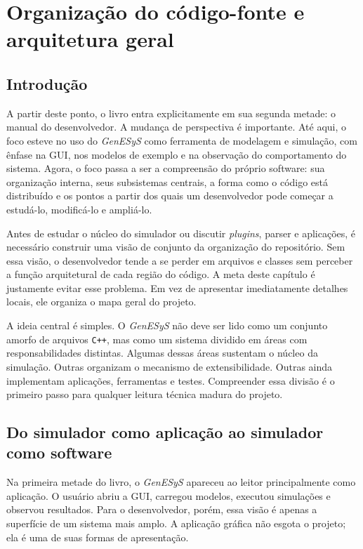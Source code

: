 \chapter{Organização do código-fonte e arquitetura geral}
\label{chap:organizacao_codigo_fonte_arquitetura_geral}

\section{Introdução}
\label{sec:cap6_introducao}

A partir deste ponto, o livro entra explicitamente em sua segunda metade: o manual do desenvolvedor. A mudança de perspectiva é importante. Até aqui, o foco esteve no uso do \textit{GenESyS} como ferramenta de modelagem e simulação, com ênfase na GUI, nos modelos de exemplo e na observação do comportamento do sistema. Agora, o foco passa a ser a compreensão do próprio software: sua organização interna, seus subsistemas centrais, a forma como o código está distribuído e os pontos a partir dos quais um desenvolvedor pode começar a estudá-lo, modificá-lo e ampliá-lo.

Antes de estudar o núcleo do simulador ou discutir \textit{plugins}, parser e aplicações, é necessário construir uma visão de conjunto da organização do repositório. Sem essa visão, o desenvolvedor tende a se perder em arquivos e classes sem perceber a função arquitetural de cada região do código. A meta deste capítulo é justamente evitar esse problema. Em vez de apresentar imediatamente detalhes locais, ele organiza o mapa geral do projeto.

A ideia central é simples. O \textit{GenESyS} não deve ser lido como um conjunto amorfo de arquivos \texttt{C++}, mas como um sistema dividido em áreas com responsabilidades distintas. Algumas dessas áreas sustentam o núcleo da simulação. Outras organizam o mecanismo de extensibilidade. Outras ainda implementam aplicações, ferramentas e testes. Compreender essa divisão é o primeiro passo para qualquer leitura técnica madura do projeto.

\section{Do simulador como aplicação ao simulador como software}
\label{sec:cap6_do_simulador_como_aplicacao_ao_software}

Na primeira metade do livro, o \textit{GenESyS} apareceu ao leitor principalmente como aplicação. O usuário abriu a GUI, carregou modelos, executou simulações e observou resultados. Para o desenvolvedor, porém, essa visão é apenas a superfície de um sistema mais amplo. A aplicação gráfica não esgota o projeto; ela é uma de suas formas de apresentação.

